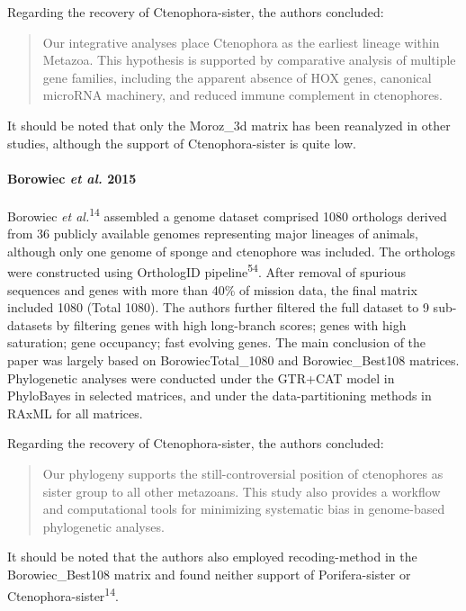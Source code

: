 \documentclass[]{article}
\let\oldparagraph\paragraph
\renewcommand{\paragraph}[1]{\oldparagraph{#1}\mbox{}}
\begin{document}
Regarding the recovery of Ctenophora-sister, the authors concluded:

\begin{quote}
Our integrative analyses place Ctenophora as the earliest lineage within
Metazoa. This hypothesis is supported by comparative analysis of
multiple gene families, including the apparent absence of HOX genes,
canonical microRNA machinery, and reduced immune complement in
ctenophores.
\end{quote}

It should be noted that only the Moroz\_3d matrix has been reanalyzed in
other studies, although the support of Ctenophora-sister is quite low.

\hypertarget{borowiec-et-al.-2015}{%
\paragraph{\texorpdfstring{Borowiec \emph{et al.}
2015}{Borowiec et al. 2015}}\label{borowiec-et-al.-2015}}

Borowiec \emph{et al.}\textsuperscript{14} assembled a genome dataset
comprised 1080 orthologs derived from 36 publicly available genomes
representing major lineages of animals, although only one genome of
sponge and ctenophore was included. The orthologs were constructed using
OrthologID pipeline\textsuperscript{54}. After removal of spurious
sequences and genes with more than 40\% of mission data, the final
matrix included 1080 (Total 1080). The authors further filtered the full
dataset to 9 sub-datasets by filtering genes with high long-branch
scores; genes with high saturation; gene occupancy; fast evolving genes.
The main conclusion of the paper was largely based on
BorowiecTotal\_1080 and Borowiec\_Best108 matrices. Phylogenetic
analyses were conducted under the GTR+CAT model in PhyloBayes in
selected matrices, and under the data-partitioning methods in RAxML for
all matrices.

Regarding the recovery of Ctenophora-sister, the authors concluded:

\begin{quote}
Our phylogeny supports the still-controversial position of ctenophores
as sister group to all other metazoans. This study also provides a
workflow and computational tools for minimizing systematic bias in
genome-based phylogenetic analyses.
\end{quote}

It should be noted that the authors also employed recoding-method in the
Borowiec\_Best108 matrix and found neither support of Porifera-sister or
Ctenophora-sister\textsuperscript{14}.
\end{document}
